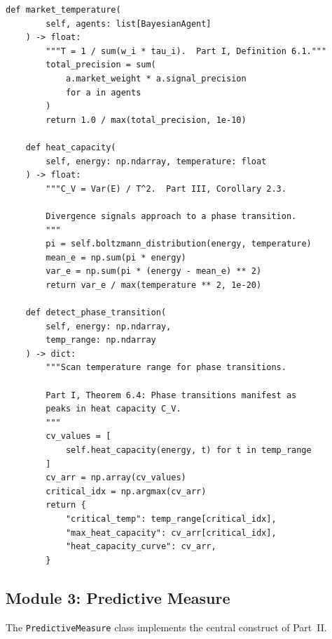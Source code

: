 \documentclass[12pt,a4paper]{article}
\theoremstyle{definition}
\begin{document}
\begin{lstlisting}[caption={Thermodynamic Engine --- Energy, free energy, phase transitions (Part~I, \S 6)},label=lst:thermo]
    def market_temperature(
        self, agents: list[BayesianAgent]
    ) -> float:
        """T = 1 / sum(w_i * tau_i).  Part I, Definition 6.1."""
        total_precision = sum(
            a.market_weight * a.signal_precision
            for a in agents
        )
        return 1.0 / max(total_precision, 1e-10)
    
    def heat_capacity(
        self, energy: np.ndarray, temperature: float
    ) -> float:
        """C_V = Var(E) / T^2.  Part III, Corollary 2.3.
        
        Divergence signals approach to a phase transition.
        """
        pi = self.boltzmann_distribution(energy, temperature)
        mean_e = np.sum(pi * energy)
        var_e = np.sum(pi * (energy - mean_e) ** 2)
        return var_e / max(temperature ** 2, 1e-20)
    
    def detect_phase_transition(
        self, energy: np.ndarray,
        temp_range: np.ndarray
    ) -> dict:
        """Scan temperature range for phase transitions.
        
        Part I, Theorem 6.4: Phase transitions manifest as
        peaks in heat capacity C_V.
        """
        cv_values = [
            self.heat_capacity(energy, t) for t in temp_range
        ]
        cv_arr = np.array(cv_values)
        critical_idx = np.argmax(cv_arr)
        return {
            "critical_temp": temp_range[critical_idx],
            "max_heat_capacity": cv_arr[critical_idx],
            "heat_capacity_curve": cv_arr,
        }
\end{lstlisting}

\subsection{Module 3: Predictive Measure}

The \texttt{PredictiveMeasure} class implements the central construct of Part~II.
\end{document}
